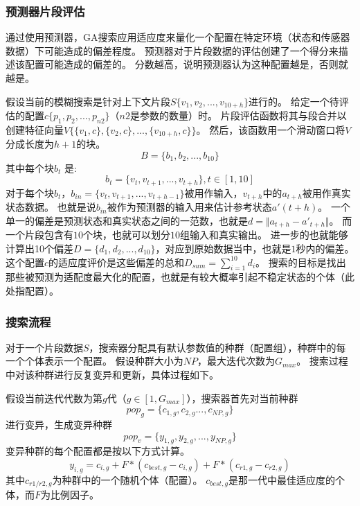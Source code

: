 \subsubsection{预测器片段评估}
通过使用预测器，GA搜索应用适应度来量化一个配置在特定环境（状态和传感器数据）下可能造成的偏差程度。
预测器对于片段数据的评估创建了一个得分来描述该配置可能造成的偏差的。
分数越高，说明预测器认为这种配置越是，否则就越是。

假设当前的模糊搜索是针对上下文片段$S\{v_{1},v_{2},...,v_{10+h}\}$进行的。
给定一个待评估的配置$c\{p_1,p_2,...,p_{n2}\}$（$n2$是参数的数量）时。
片段评估函数将其与段合并以创建特征向量$V\{\{v_1, c\}, \{v_2, c\},...,\{v_{10+h}, c\}\}$。
然后，该函数用一个滑动窗口将$V$分成长度为$h+1$的块。
\begin{equation}
    B = \{b_{1}, b_{2}, ..., b_{10}\} 
\end{equation}  
其中每个块$b_{t}$ 是:
\begin{equation}
    b_{t} = \{v_{t}, v_{t+1}, ..., v_{t+h}\}, t\in[1, 10] 
\end{equation}
对于每个块$b_{t}$，$b_{in}=\{v_t,v_{t+1},...,v_{t+h-1}\}$被用作输入，$v_{t+h}$中的$a_{t+h}$被用作真实状态数据。
也就是说$b_{in}$被作为预测器的输入用来估计参考状态$a'(t+h)$。
一个单一的偏差是预测状态和真实状态之间的一范数，也就是$d = \Vert a_{t+h} - a'_{t+h} \Vert$。  
而一个片段包含有$10$个块，也就可以划分$10$组输入和真实输出。
进一步的也就能够计算出10个偏差$D=\{d_1, d_2, ..., d_{10}\}$，对应到原始数据当中，也就是$1$秒内的偏差。
这个配置$c$的适应度评价是这些偏差的总和$D_{sum}=\sum_{i=1}^{10}{d_i}$。
搜索的目标是找出那些被预测为适配度最大化的配置，也就是有较大概率引起不稳定状态的个体（此处指配置）。


\subsubsection{搜索流程}
对于一个片段数据$S$，搜索器分配具有默认参数值的种群（配置组），种群中的每一个个体表示一个配置。
假设种群大小为$NP$，最大迭代次数为$G_{max}$。
搜索过程中对该种群进行反复变异和更新，具体过程如下。

假设当前迭代代数为第$g$代（$g\in[1,G_{max}]$），搜索器首先对当前种群
\begin{equation}
pop_g=\{c_{1,g},c_{2,g}...,c_{NP,g}\}   
\end{equation}
进行变异，生成变异种群
\begin{equation}
pop_v=\{y_{1,g},y_{2,g},...,y_{NP,g}\}
\end{equation}
变异种群的每个配置都是按以下方式计算。
\begin{equation}
    y_{i,g} = c_{i,g} + F * (c_{best,g} - c_{i,g}) + F * (c_{r1,g} - c_{r2,g})
\end{equation}
其中$c_{r1/r2,g}$为种群中的一个随机个体（配置）。
$c_{best,g}$是那一代中最佳适应度的个体，而$F$为比例因子。

